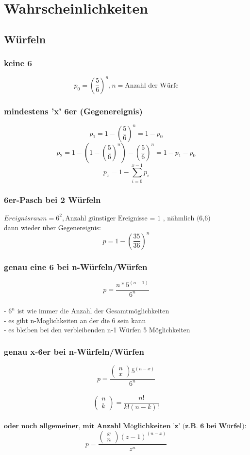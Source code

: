 \documentclass{article}
\begin{document}
\section{Wahrscheinlichkeiten}
\subsection{W\"urfeln}
\subsubsection{keine 6}
\[
	p_0 = \left( \frac{5}{6} \right)^n , n = \text{Anzahl der W\"urfe}
\]
\subsubsection{mindestens 'x' 6er (Gegenereignis)}
\[	
	p_1 = 1 - \left( \frac{5}{6} \right)^n = 1 - p_0
\]	
\[		
	p_2 = 1-\left(1 - \left( \frac{5}{6} \right)^n\right)-\left( \frac{5}{6} \right)^n = 1-p_1 -p_0
\]
\[
	p_x = 1 - \sum_{i=0}^{x-1} p_i
\]
\subsubsection{6er-Pasch bei 2 W\"urfeln}
$Ereignisraum = 6^2 , \text{Anzahl g\"unstiger Ereignisse = 1 , n\"ahmlich (6,6)}$\\
dann wieder \"uber Gegenereignis: \\
\[ p=1-\left(\frac{35}{36}\right)^n \]
\subsubsection{genau eine 6 bei n-W\"urfeln/W\"urfen}
\[ p= \frac{n*5^{(n-1)}}{6^n}\]\\
- $6^n $ ist wie immer die Anzahl der Gesamtm\"oglichkeiten \\
- es gibt n-Moglichkeiten an der die 6 sein kann \\
- es bleiben bei den verbleibenden n-1 W\"urfen 5 M\"oglichkeiten
\subsubsection{genau x-6er bei n-W\"urfeln/W\"urfen}
\[ p= \frac{\begin{pmatrix}
			n\\x
\end{pmatrix}5^{(n-x)}}{6^n}\]\\
\[\begin{pmatrix}
		n\\k
	\end{pmatrix}= \frac{n!}{k!(n-k)!}
\]\\
$\textbf{oder noch allgemeiner, mit Anzahl M\"oglichkeiten 'z' (z.B. 6 bei W\"urfel):}$\[
	p= \frac{\begin{pmatrix}
			x\\n
	\end{pmatrix}(z-1)^{(n-x)}}{z^n}
\]
\end{document}
